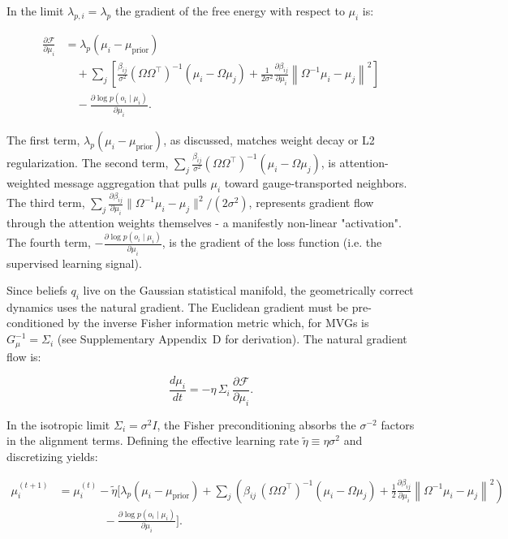 \documentclass[twoside,11pt]{article}
\begin{document}
In the limit $\lambda_{p,i} = \lambda_p$ the gradient of the free energy with respect to $\mu_i$ is:

\begin{equation}
\boxed{
\begin{aligned}
\frac{\partial \mathcal{F}}{\partial \mu_i}
&= \lambda_p \left(\mu_i - \mu_{\text{prior}}\right) \\
&\quad + \sum_j \left[
    \frac{\beta_{ij}}{\sigma^2}(\Omega\Omega^\top)^{-1}\left(\mu_i - \Omega\mu_j\right)
    + \frac{1}{2\sigma^2}
      \frac{\partial \beta_{ij}}{\partial \mu_i}
      \left\|\Omega^{-1}\mu_i - \mu_j\right\|^2
\right] \\
&\quad - \frac{\partial \log p(o_i \mid \mu_i)}{\partial \mu_i}.
\end{aligned}
}
\end{equation}

The first term, $\lambda_p(\mu_i - \mu_{\text{prior}})$, as discussed, matches weight decay or L2 regularization. The second term, $\sum_j \frac{\beta_{ij}}{\sigma^2}(\Omega\Omega^\top)^{-1}(\mu_i - \Omega\mu_j)$, is attention-weighted message aggregation that pulls $\mu_i$ toward gauge-transported neighbors. The third term, $\sum_j \frac{\partial \beta_{ij}}{\partial \mu_i}\|\Omega^{-1}\mu_i - \mu_j\|^2/(2\sigma^2)$, represents gradient flow through the attention weights themselves - a manifestly non-linear "activation". The fourth term, $-\frac{\partial \log p(o_i \mid \mu_i)}{\partial \mu_i}$, is the gradient of the loss function (i.e. the supervised learning signal).

Since beliefs $q_i$ live on the Gaussian statistical manifold, the geometrically correct dynamics uses the natural gradient. The Euclidean gradient must be pre-conditioned by the inverse Fisher information metric which, for MVGs is $G_\mu^{-1} = \Sigma_i$ (see Supplementary Appendix~D for derivation). The natural gradient flow is:

\begin{equation}
\frac{d\mu_i}{dt} = -\eta \,\Sigma_i\,\frac{\partial \mathcal{F}}{\partial \mu_i}.
\end{equation}

In the isotropic limit $\Sigma_i = \sigma^2 I$, the Fisher preconditioning absorbs the $\sigma^{-2}$ factors in the alignment terms. Defining the effective learning rate $\tilde{\eta} \equiv \eta\sigma^2$ and discretizing yields:

\begin{equation}
\boxed{
\begin{aligned}
\mu_i^{(t+1)}
&= \mu_i^{(t)}
- \tilde{\eta} \Bigg[
    \lambda_p \left(\mu_i - \mu_{\text{prior}}\right)
    + \sum_j \left(
        \beta_{ij}\,(\Omega\Omega^\top)^{-1}\left(\mu_i - \Omega\mu_j\right)
        + \frac{1}{2}
          \frac{\partial \beta_{ij}}{\partial \mu_i}
          \left\|\Omega^{-1}\mu_i - \mu_j\right\|^2
      \right) \\
&\qquad\qquad
    - \frac{\partial \log p(o_i \mid \mu_i)}{\partial \mu_i}
\Bigg].
\end{aligned}
}
\end{equation}
\end{document}
